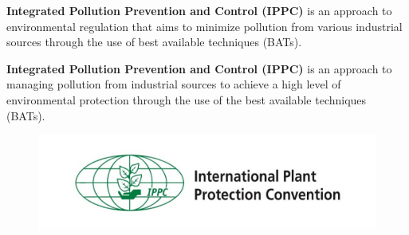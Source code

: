 \documentclass[11pt]{article}
\begin{document}
\textbf{Integrated Pollution Prevention and Control (IPPC)} is an approach to environmental regulation that aims to minimize pollution from various industrial sources through the use of best available techniques (BATs).


\textbf{Integrated Pollution Prevention and Control (IPPC)} is an approach to managing pollution from industrial sources to achieve a high level of environmental protection through the use of the best available techniques (BATs).

\begin{figure}[H]
	\centering
	\includegraphics[width=.95\textwidth]{ippc_logo_green_2lines_en.jpg}
\end{figure}
\end{document}
